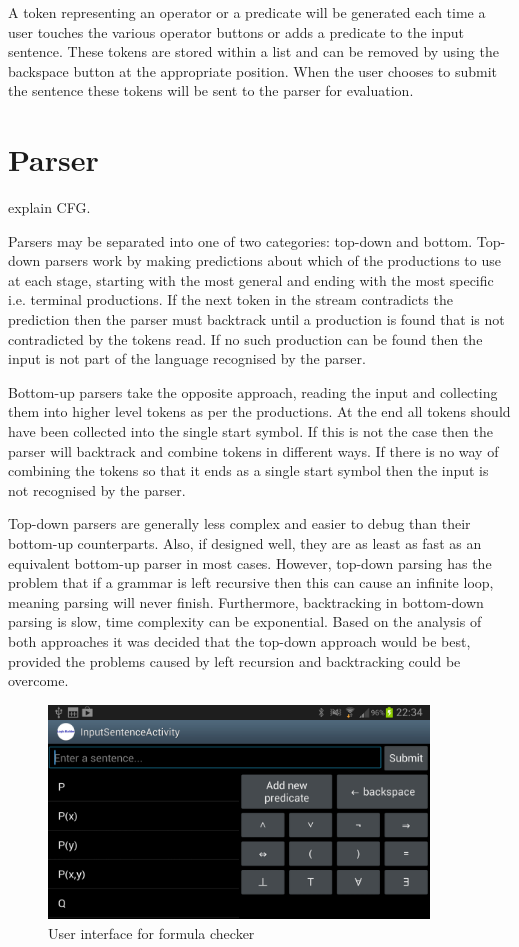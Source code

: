 A token representing an operator or a predicate will be generated each time a user touches the various operator buttons or adds a predicate to the input sentence. These tokens are stored within a list and can be removed by using the backspace button at the appropriate position. When the user chooses to submit the sentence these tokens will be sent to the parser for evaluation.

\section{Parser}

explain CFG.

Parsers may be separated into one of two categories: top-down and bottom. Top-down parsers work by making predictions about which of the productions to use at each stage, starting with the most general and ending with the most specific i.e. terminal productions. If the next token in the stream contradicts the prediction then the parser must backtrack until a production is found that is not contradicted by the tokens read. If no such production can be found then the input is not part of the language recognised by the parser. 

Bottom-up parsers take the opposite approach, reading the input and collecting them into higher level tokens as per the productions. At the end all tokens should have been collected into the single start symbol. If this is not the case then the parser will backtrack and combine tokens in different ways. If there is no way of combining the tokens so that it ends as a single start symbol then the input is not recognised by the parser.

Top-down parsers are generally less complex and easier to debug than their bottom-up counterparts. Also, if designed well, they are as least as fast as an equivalent bottom-up parser in most cases. \cite{cooper2011engineering} However, top-down parsing has the problem that if a grammar is left recursive then this can cause an infinite loop, meaning parsing will never finish. Furthermore, backtracking in bottom-down parsing is slow,  time complexity can be exponential. Based on the analysis of both approaches it was decided that the top-down approach would be best, provided the problems caused by left recursion and backtracking could be overcome. 

\begin{figure}[h]
\centering
\includegraphics[width=0.9\textwidth]{Images/formulachecker.png}
\caption{User interface for formula checker}
\label{fig:Compilation}
\end{figure}

